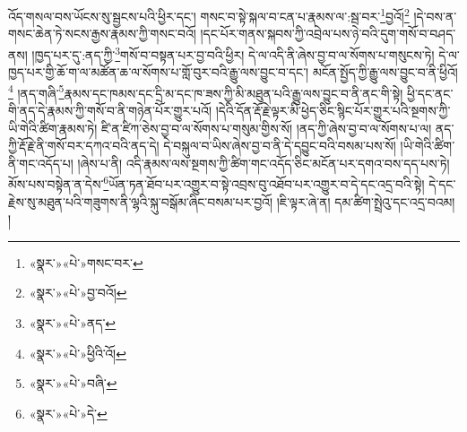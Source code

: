 འོད་གསལ་བས་ཡོངས་སུ་སྦྱངས་པའི་ཕྱིར་དང་། གསང་བ་སྟེ་སྐལ་བ་ངན་པ་རྣམས་ལ་:སྦ་བར་\footnote{«སྣར་»«པེ་»གསང་བར་}བྱའོ།\footnote{«སྣར་»«པེ་»བྱ་བའོ།} །དེ་བས་ན་གསང་ཆེན་ཏེ་སངས་རྒྱས་རྣམས་ཀྱི་གསང་བའོ། །དང་པོར་གནས་སྐབས་ཀྱི་འབྲེལ་པས་ཉེ་བའི་དུག་གསོ་བ་བཤད་ནས། །ཁྱད་པར་དུ་:ནད་ཀྱི་\footnote{«སྣར་»«པེ་»ནད་}གསོ་བ་བསྟན་པར་བྱ་བའི་ཕྱིར། དེ་ལ་འདི་ནི་ཞེས་བྱ་བ་ལ་སོགས་པ་གསུངས་ཏེ། དེ་ལ་ཁྱད་པར་གྱི་ཆོ་ག་ལ་མཚོན་ཆ་ལ་སོགས་པ་གློ་བུར་བའི་རྒྱུ་ལས་བྱུང་བ་དང་། མངོན་སྤྱོད་ཀྱི་རྒྱུ་ལས་བྱུང་བ་ནི་ཕྱིའོ།\footnote{«སྣར་»«པེ་»ཕྱིའི་འོ།} །ནད་གཞི་\footnote{«སྣར་»«པེ་»བཞི་}རྣམས་དང་ཁམས་དང་དྲི་མ་དང་ཁ་ཟས་ཀྱི་མི་མཐུན་པའི་རྒྱུ་ལས་བྱུང་བ་ནི་ནང་གི་སྟེ། ཕྱི་དང་ནང་གི་ནད་དེ་རྣམས་ཀྱི་གསོ་བ་ནི་གཉེན་པོར་གྱུར་པའོ། །དེའི་དོན་རྡོ་རྗེ་ལྟར་མི་ཕྱེད་ཅིང་སྙིང་པོར་གྱུར་པའི་སྔགས་ཀྱི་ཡི་གེའི་ཚིག་རྣམས་ཏེ། ཛི་ན་ཛིཀ་ཅེས་བྱ་བ་ལ་སོགས་པ་གསུམ་གྱིས་སོ། །ནད་ཀྱི་ཞེས་བྱ་བ་ལ་སོགས་པ་ལ། ནད་ཀྱི་རྡོ་རྗེ་ནི་གསོ་བར་དཀའ་བའི་ནད་དེ། དེ་བསྐུལ་བ་ཡིས་ཞེས་བྱ་བ་ནི་དེ་དབྱུང་བའི་བསམ་པས་སོ། །ཡི་གེའི་ཚིག་ནི་གང་འདོད་པ། །ཞེས་པ་ནི། འདི་རྣམས་ལས་སྔགས་ཀྱི་ཚིག་གང་འདོད་ཅིང་མངོན་པར་དགའ་བས་དད་པས་ཏེ། མོས་པས་བསྟེན་ན་དེས་\footnote{«སྣར་»«པེ་»དེ་}ཡོན་ཏན་ཐོབ་པར་འགྱུར་བ་སྟེ་འབྲས་བུ་འཐོབ་པར་འགྱུར་བ་དེ་དང་འདྲ་བའི་སྟེ། དེ་དང་རྗེས་སུ་མཐུན་པའི་གཟུགས་ནི་ལྷའི་སྐུ་བསྒོམ་ཞིང་བསམ་པར་བྱའོ། །ཇི་ལྟར་ཞེ་ན། དམ་ཚིག་སྤྲེའུ་དང་འདྲ་བའམ། །
